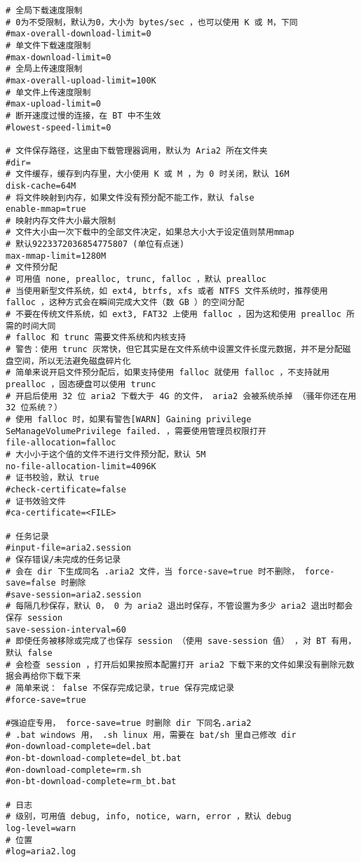 \documentclass[11pt]{article}
\begin{document}
\begin{lstlisting}
# 全局下载速度限制
# 0为不受限制，默认为0，大小为 bytes/sec ，也可以使用 K 或 M，下同
#max-overall-download-limit=0
# 单文件下载速度限制
#max-download-limit=0
# 全局上传速度限制
#max-overall-upload-limit=100K
# 单文件上传速度限制
#max-upload-limit=0
# 断开速度过慢的连接，在 BT 中不生效
#lowest-speed-limit=0

# 文件保存路径，这里由下载管理器调用，默认为 Aria2 所在文件夹
#dir=
# 文件缓存，缓存到内存里，大小使用 K 或 M ，为 0 时关闭，默认 16M
disk-cache=64M
# 将文件映射到内存，如果文件没有预分配不能工作，默认 false
enable-mmap=true
# 映射内存文件大小最大限制
# 文件大小由一次下载中的全部文件决定，如果总大小大于设定值则禁用mmap
# 默认9223372036854775807 (单位有点迷)
max-mmap-limit=1280M
# 文件预分配
# 可用值 none, prealloc, trunc, falloc ，默认 prealloc
# 当使用新型文件系统，如 ext4, btrfs, xfs 或者 NTFS 文件系统时，推荐使用 falloc ，这种方式会在瞬间完成大文件（数 GB ）的空间分配
# 不要在传统文件系统，如 ext3, FAT32 上使用 falloc ，因为这和使用 prealloc 所需的时间大同
# falloc 和 trunc 需要文件系统和内核支持
# 警告：使用 trunc 灰常快，但它其实是在文件系统中设置文件长度元数据，并不是分配磁盘空间，所以无法避免磁盘碎片化
# 简单来说开启文件预分配后，如果支持使用 falloc 就使用 falloc ，不支持就用 prealloc ，固态硬盘可以使用 trunc
# 开启后使用 32 位 aria2 下载大于 4G 的文件， aria2 会被系统杀掉 （骚年你还在用 32 位系统？）
# 使用 falloc 时，如果有警告[WARN] Gaining privilege SeManageVolumePrivilege failed. ，需要使用管理员权限打开
file-allocation=falloc
# 大小小于这个值的文件不进行文件预分配，默认 5M
no-file-allocation-limit=4096K
# 证书校验，默认 true
#check-certificate=false
# 证书效验文件
#ca-certificate=<FILE>

# 任务记录
#input-file=aria2.session
# 保存错误/未完成的任务记录
# 会在 dir 下生成同名 .aria2 文件，当 force-save=true 时不删除， force-save=false 时删除
#save-session=aria2.session
# 每隔几秒保存，默认 0， 0 为 aria2 退出时保存，不管设置为多少 aria2 退出时都会保存 session
save-session-interval=60
# 即使任务被移除或完成了也保存 session （使用 save-session 值） ，对 BT 有用，默认 false
# 会检查 session ，打开后如果按照本配置打开 aria2 下载下来的文件如果没有删除元数据会再给你下载下来
# 简单来说： false 不保存完成记录，true 保存完成记录
#force-save=true

#强迫症专用， force-save=true 时删除 dir 下同名.aria2
# .bat windows 用， .sh linux 用，需要在 bat/sh 里自己修改 dir
#on-download-complete=del.bat
#on-bt-download-complete=del_bt.bat
#on-download-complete=rm.sh
#on-bt-download-complete=rm_bt.bat

# 日志
# 级别，可用值 debug, info, notice, warn, error ，默认 debug
log-level=warn
# 位置
#log=aria2.log


\end{lstlisting}
\end{document}
